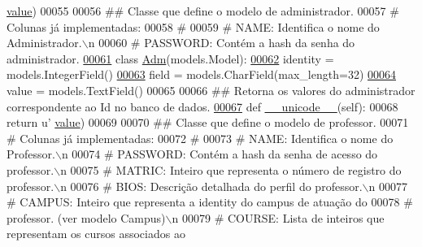 \begin{DoxyCode}
{      \hyperlink{classELO_1_1models_1_1Student_a201226779dce6e064cb16bd92ed016e2}{value})
00055 
00056 \textcolor{comment}{## Classe que define o modelo de administrador.}
00057 \textcolor{comment}{#   Colunas já implementadas:}
00058 \textcolor{comment}{#}
00059 \textcolor{comment}{#   NAME:       Identifica o nome do Administrador.\(\backslash\)n}
00060 \textcolor{comment}{#   PASSWORD:   Contém a hash da senha do administrador.}
\hypertarget{ELO_2models_8py_source_l00061}{}\hyperlink{classELO_1_1models_1_1Adm}{00061} \textcolor{keyword}{class }\hyperlink{classELO_1_1models_1_1Adm}{Adm}(models.Model):
\hypertarget{ELO_2models_8py_source_l00062}{}\hyperlink{classELO_1_1models_1_1Adm_af7e7b797ce5d3396e8a54d8927450d75}{00062}     identity = models.IntegerField()
\hypertarget{ELO_2models_8py_source_l00063}{}\hyperlink{classELO_1_1models_1_1Adm_ae1af4ca22491b1cfe9cb0a7acefaa71e}{00063}     field = models.CharField(max\_length=32)
\hypertarget{ELO_2models_8py_source_l00064}{}\hyperlink{classELO_1_1models_1_1Adm_a98f249c493fbcbcd347297437a098212}{00064}     value = models.TextField()
00065 
00066     \textcolor{comment}{## Retorna os valores do administrador correspondente ao Id no banco de dados.}
\hypertarget{ELO_2models_8py_source_l00067}{}\hyperlink{classELO_1_1models_1_1Adm_a321eaeaced2b6423fd23ad9d0401808e}{00067}     \textcolor{keyword}{def }\hyperlink{classELO_1_1models_1_1Adm_a321eaeaced2b6423fd23ad9d0401808e}{\_\_unicode\_\_}(self):
00068         \textcolor{keywordflow}{return} \textcolor{stringliteral}{u'%
      \hyperlink{classELO_1_1models_1_1Adm_a98f249c493fbcbcd347297437a098212}{value})
00069 
00070 \textcolor{comment}{## Classe que define o modelo de professor.}
00071 \textcolor{comment}{#   Colunas já implementadas:}
00072 \textcolor{comment}{#}
00073 \textcolor{comment}{#   NAME:       Identifica o nome do Professor.\(\backslash\)n}
00074 \textcolor{comment}{#   PASSWORD:   Contém a hash da senha de acesso do professor.\(\backslash\)n}
00075 \textcolor{comment}{#   MATRIC:     Inteiro que representa o número de registro do professor.\(\backslash\)n}
00076 \textcolor{comment}{#   BIOS:       Descrição detalhada do perfil do professor.\(\backslash\)n}
00077 \textcolor{comment}{#   CAMPUS:     Inteiro que representa a identity do campus de atuação do}
00078 \textcolor{comment}{#                   professor. (ver modelo Campus)\(\backslash\)n}
00079 \textcolor{comment}{#   COURSE:     Lista de inteiros que representam os cursos associados ao}
}}
\end{DoxyCode}
